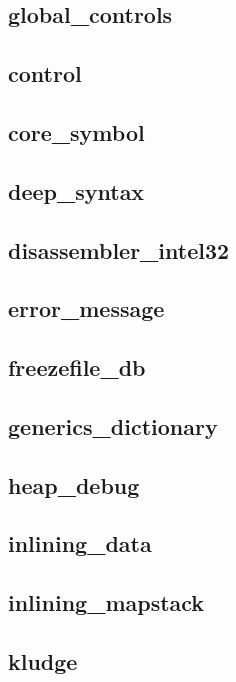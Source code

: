 \subsection{global\_controls}					
\subsection{control}						
\subsection{core\_symbol}					
\subsection{deep\_syntax}					
\subsection{disassembler\_intel32}				
\subsection{error\_message}					
\subsection{freezefile\_db}					
\subsection{generics\_dictionary}				
\subsection{heap\_debug}					
\subsection{inlining\_data}					
\subsection{inlining\_mapstack}					
\subsection{kludge}						

